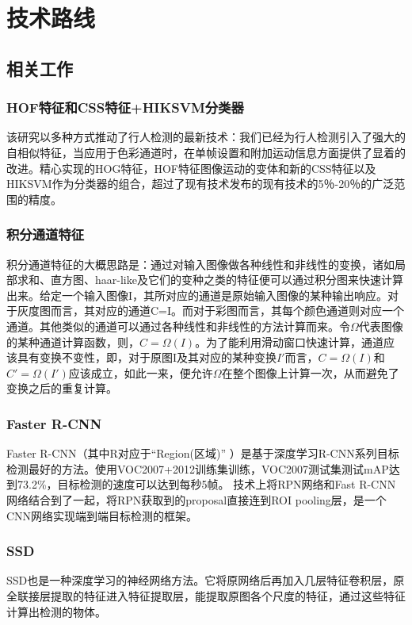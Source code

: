\chapter{技术路线}

\section{相关工作}
\subsection{HOF特征和CSS特征+HIKSVM分类器\cite{walk2010new}}{
该研究以多种方式推动了行人检测的最新技术：我们已经为行人检测引入了强大的自相似特征，当应用于色彩通道时，在单帧设置和附加运动信息方面提供了显着的改进。精心实现的HOG特征，HOF特征图像运动的变体和新的CSS特征以及HIKSVM作为分类器的组合，超过了现有技术发布的现有技术的5％-20％的广泛范围的精度。
}

\subsection{积分通道特征\cite{integral}}{
积分通道特征的大概思路是：通过对输入图像做各种线性和非线性的变换，诸如局部求和、直方图、haar-like及它们的变种之类的特征便可以通过积分图来快速计算出来。给定一个输入图像I，其所对应的通道是原始输入图像的某种输出响应。对于灰度图而言，其对应的通道C=I。而对于彩图而言，其每个颜色通道则对应一个通道。其他类似的通道可以通过各种线性和非线性的方法计算而来。令$\Omega$代表图像的某种通道计算函数，则，$C=\Omega(I)$。为了能利用滑动窗口快速计算，通道应该具有变换不变性，即，对于原图I及其对应的某种变换$I'$而言，$C=\Omega(I)$和$C'=\Omega(I')$应该成立，如此一来，便允许$\Omega$在整个图像上计算一次，从而避免了变换之后的重复计算。
}

\subsection{Faster R-CNN\cite{faster}}{
Faster R-CNN（其中R对应于“Region(区域)” ）是基于深度学习R-CNN系列目标检测最好的方法。使用VOC2007+2012训练集训练，VOC2007测试集测试mAP达到73.2\%，目标检测的速度可以达到每秒5帧。
技术上将RPN网络和Fast R-CNN网络结合到了一起，将RPN获取到的proposal直接连到ROI pooling层，是一个CNN网络实现端到端目标检测的框架。
}

\subsection{SSD\cite{ssd}}{
SSD也是一种深度学习的神经网络方法。它将原网络后再加入几层特征卷积层，原全联接层提取的特征进入特征提取层，能提取原图各个尺度的特征，通过这些特征计算出检测的物体。
}

